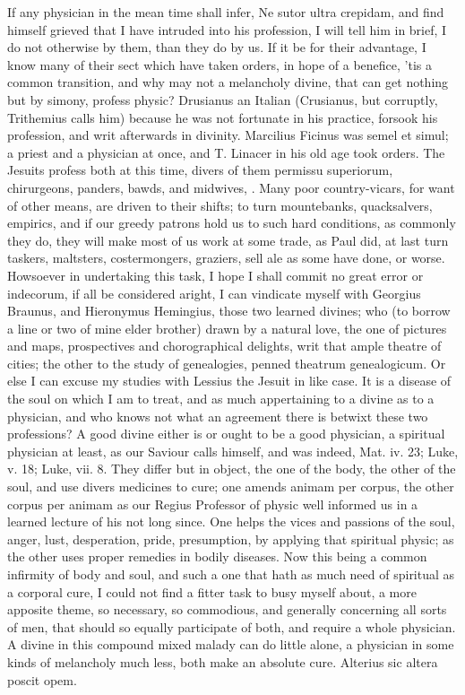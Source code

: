 {If any physician in the mean time shall infer, Ne sutor ultra crepidam,
and find himself grieved that I have intruded into his profession, I
will tell him in brief, I do not otherwise by them, than they do by us.
If it be for their advantage, I know many of their sect which have
taken orders, in hope of a benefice, 'tis a common transition, and why
may not a melancholy divine, that can get nothing but by simony,
profess physic? Drusianus an Italian (Crusianus, but corruptly,
Trithemius calls him) because he was not fortunate in his
practice, forsook his profession, and writ afterwards in divinity.
Marcilius Ficinus was semel et simul; a priest and a physician at once,
and T. Linacer in his old age took orders. The Jesuits profess
both at this time, divers of them permissu superiorum, chirurgeons,
panders, bawds, and midwives, \etc. Many poor country-vicars, for want of
other means, are driven to their shifts; to turn mountebanks,
quacksalvers, empirics, and if our greedy patrons hold us to such hard
conditions, as commonly they do, they will make most of us work at some
trade, as Paul did, at last turn taskers, maltsters, costermongers,
graziers, sell ale as some have done, or worse. Howsoever in
undertaking this task, I hope I shall commit no great error or
indecorum, if all be considered aright, I can vindicate myself with
Georgius Braunus, and Hieronymus Hemingius, those two learned divines;
who (to borrow a line or two of mine elder brother) drawn by a
natural love, the one of pictures and maps, prospectives and
chorographical delights, writ that ample theatre of cities; the other
to the study of genealogies, penned theatrum genealogicum. Or else I
can excuse my studies with Lessius the Jesuit in like case. It is
a disease of the soul on which I am to treat, and as much appertaining
to a divine as to a physician, and who knows not what an agreement
there is betwixt these two professions? A good divine either is or
ought to be a good physician, a spiritual physician at least, as our
Saviour calls himself, and was indeed, Mat. iv. 23; Luke, v. 18; Luke,
vii. 8. They differ but in object, the one of the body, the other of
the soul, and use divers medicines to cure; one amends animam per
corpus, the other corpus per animam as our Regius Professor of
physic well informed us in a learned lecture of his not long since. One
helps the vices and passions of the soul, anger, lust, desperation,
pride, presumption, \etc by applying that spiritual physic; as the other
uses proper remedies in bodily diseases. Now this being a common
infirmity of body and soul, and such a one that hath as much need of
spiritual as a corporal cure, I could not find a fitter task to busy
myself about, a more apposite theme, so necessary, so commodious, and
generally concerning all sorts of men, that should so equally
participate of both, and require a whole physician. A divine in this
compound mixed malady can do little alone, a physician in some kinds of
melancholy much less, both make an absolute cure.
Alterius sic altera poscit opem.

}
